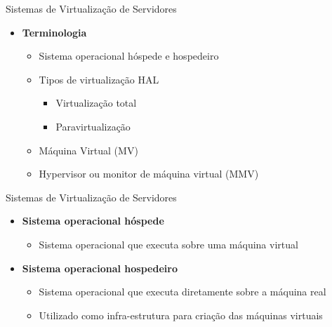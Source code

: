 \documentclass{beamer}
\begin{document}
\begin{frame}{Sistemas de Virtualização de Servidores}
    \begin{itemize}
        \item \textbf{Terminologia}
        \begin{itemize}
            \item Sistema operacional hóspede e hospedeiro
            \item Tipos de virtualização HAL
            \begin{itemize}
                \item Virtualização total
                \item Paravirtualização
            \end{itemize}
            \item Máquina Virtual (MV)
            \item Hypervisor ou monitor de máquina virtual (MMV)
        \end{itemize}
    \end{itemize}
\end{frame}
\begin{frame}{Sistemas de Virtualização de Servidores}
    \begin{itemize}
        \item \textbf{Sistema operacional hóspede}
        \begin{itemize}
            \item Sistema operacional que executa sobre uma máquina virtual
        \end{itemize}
        
        \item \textbf{Sistema operacional hospedeiro}
        \begin{itemize}
            \item Sistema operacional que executa diretamente sobre a máquina real
            \item Utilizado como infra-estrutura para criação das máquinas virtuais
        \end{itemize}
    \end{itemize}
\end{frame}
\end{document}
